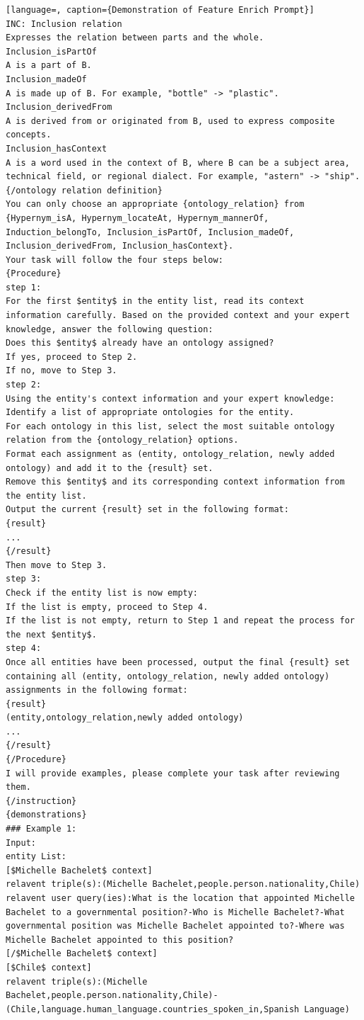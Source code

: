 \documentclass[11pt]{article}
\begin{document}
\begin{lstlisting}[language=, caption={Demonstration of Feature Enrich Prompt}]
INC: Inclusion relation
Expresses the relation between parts and the whole. 
Inclusion_isPartOf
A is a part of B.
Inclusion_madeOf
A is made up of B. For example, "bottle" -> "plastic". 
Inclusion_derivedFrom
A is derived from or originated from B, used to express composite concepts.
Inclusion_hasContext
A is a word used in the context of B, where B can be a subject area, technical field, or regional dialect. For example, "astern" -> "ship".
{/ontology relation definition}
You can only choose an appropriate {ontology_relation} from {Hypernym_isA, Hypernym_locateAt, Hypernym_mannerOf, Induction_belongTo, Inclusion_isPartOf, Inclusion_madeOf, Inclusion_derivedFrom, Inclusion_hasContext}.
Your task will follow the four steps below:
{Procedure}
step 1:
For the first $entity$ in the entity list, read its context information carefully. Based on the provided context and your expert knowledge, answer the following question:
Does this $entity$ already have an ontology assigned?
If yes, proceed to Step 2.
If no, move to Step 3.
step 2:
Using the entity's context information and your expert knowledge:
Identify a list of appropriate ontologies for the entity.
For each ontology in this list, select the most suitable ontology relation from the {ontology_relation} options.
Format each assignment as (entity, ontology_relation, newly added ontology) and add it to the {result} set.
Remove this $entity$ and its corresponding context information from the entity list.
Output the current {result} set in the following format:
{result}
...
{/result}
Then move to Step 3.
step 3:
Check if the entity list is now empty:
If the list is empty, proceed to Step 4.
If the list is not empty, return to Step 1 and repeat the process for the next $entity$.
step 4:
Once all entities have been processed, output the final {result} set containing all (entity, ontology_relation, newly added ontology) assignments in the following format:
{result}
(entity,ontology_relation,newly added ontology)
...
{/result}
{/Procedure}
I will provide examples, please complete your task after reviewing them.
{/instruction}
{demonstrations}
### Example 1:
Input:
entity List:
[$Michelle Bachelet$ context]
relavent triple(s):(Michelle Bachelet,people.person.nationality,Chile)
relavent user query(ies):What is the location that appointed Michelle Bachelet to a governmental position?-Who is Michelle Bachelet?-What governmental position was Michelle Bachelet appointed to?-Where was Michelle Bachelet appointed to this position?
[/$Michelle Bachelet$ context]
[$Chile$ context]
relavent triple(s):(Michelle Bachelet,people.person.nationality,Chile)-(Chile,language.human_language.countries_spoken_in,Spanish Language)

\end{lstlisting}
\end{document}
